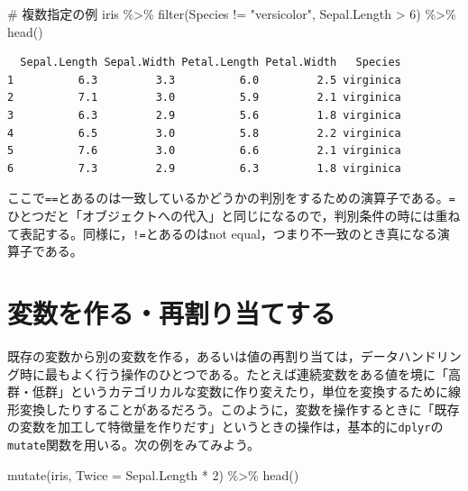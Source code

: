 \documentclass[
  a4paper,
]{ltjsbook}
\newenvironment{Shaded}{\begin{snugshade}}{\end{snugshade}}
\newcommand{\AttributeTok}[1]{\textcolor[rgb]{0.40,0.45,0.13}{#1}}
\newcommand{\CommentTok}[1]{\textcolor[rgb]{0.37,0.37,0.37}{#1}}
\newcommand{\DecValTok}[1]{\textcolor[rgb]{0.68,0.00,0.00}{#1}}
\newcommand{\FunctionTok}[1]{\textcolor[rgb]{0.28,0.35,0.67}{#1}}
\newcommand{\NormalTok}[1]{\textcolor[rgb]{0.00,0.23,0.31}{#1}}
\newcommand{\SpecialCharTok}[1]{\textcolor[rgb]{0.37,0.37,0.37}{#1}}
\newcommand{\StringTok}[1]{\textcolor[rgb]{0.13,0.47,0.30}{#1}}
\begin{document}
\begin{Shaded}
\begin{Highlighting}[]
\CommentTok{\# 複数指定の例}
\NormalTok{iris }\SpecialCharTok{\%\textgreater{}\%}
  \FunctionTok{filter}\NormalTok{(Species }\SpecialCharTok{!=} \StringTok{"versicolor"}\NormalTok{, Sepal.Length }\SpecialCharTok{\textgreater{}} \DecValTok{6}\NormalTok{) }\SpecialCharTok{\%\textgreater{}\%}
  \FunctionTok{head}\NormalTok{()}
\end{Highlighting}
\end{Shaded}

\begin{verbatim}
  Sepal.Length Sepal.Width Petal.Length Petal.Width   Species
1          6.3         3.3          6.0         2.5 virginica
2          7.1         3.0          5.9         2.1 virginica
3          6.3         2.9          5.6         1.8 virginica
4          6.5         3.0          5.8         2.2 virginica
5          7.6         3.0          6.6         2.1 virginica
6          7.3         2.9          6.3         1.8 virginica
\end{verbatim}

ここで\texttt{==}とあるのは一致しているかどうかの判別をするための演算子である。\texttt{=}ひとつだと「オブジェクトへの代入」と同じになるので，判別条件の時には重ねて表記する。同様に，\texttt{!=}とあるのはnot
equal，つまり不一致のとき真になる演算子である。

\section{変数を作る・再割り当てする}\label{ux5909ux6570ux3092ux4f5cux308bux518dux5272ux308aux5f53ux3066ux3059ux308b}

既存の変数から別の変数を作る，あるいは値の再割り当ては，データハンドリング時に最もよく行う操作のひとつである。たとえば連続変数をある値を境に「高群・低群」というカテゴリカルな変数に作り変えたり，単位を変換するために線形変換したりすることがあるだろう。このように，変数を操作するときに「既存の変数を加工して特徴量を作りだす」というときの操作は，基本的に\texttt{dplyr}の\texttt{mutate}関数を用いる。次の例をみてみよう。

\begin{Shaded}
\begin{Highlighting}[]
\FunctionTok{mutate}\NormalTok{(iris, }\AttributeTok{Twice =}\NormalTok{ Sepal.Length }\SpecialCharTok{*} \DecValTok{2}\NormalTok{) }\SpecialCharTok{\%\textgreater{}\%} \FunctionTok{head}\NormalTok{()}
\end{Highlighting}
\end{Shaded}
\end{document}
